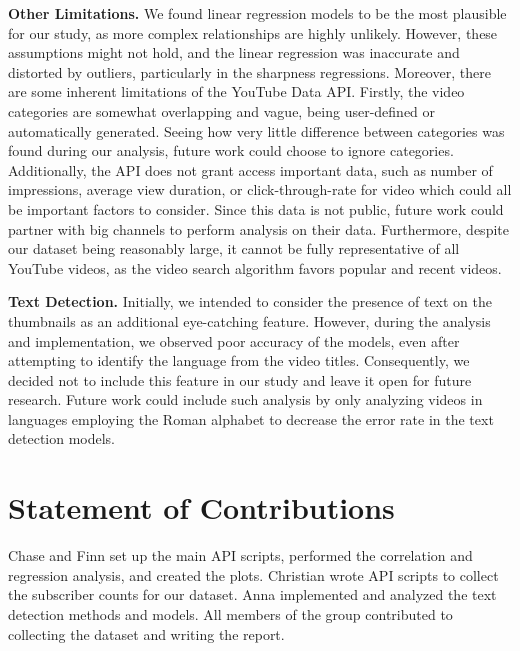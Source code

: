 \documentclass{article}
\begin{document}
\textbf{Other Limitations.} We found linear regression models to be the most plausible for our study, as more complex relationships are highly unlikely. However, these assumptions might not hold, and the linear regression was inaccurate and distorted by outliers, particularly in the sharpness regressions. Moreover, there are some inherent limitations of the YouTube Data API. Firstly, the video categories are somewhat overlapping and vague, being user-defined or automatically generated. Seeing how very little difference between categories was found during our analysis, future work could choose to ignore categories. Additionally, the API does not grant access important data, such as number of impressions, average view duration, or click-through-rate for video which could all be important factors to consider. Since this data is not public, future work could partner with big channels to perform analysis on their data. Furthermore, despite our dataset being reasonably large, it cannot be fully representative of all YouTube videos, as the video search algorithm favors popular and recent videos. 

\textbf{Text Detection.} Initially, we intended to consider the presence of text on the thumbnails as an additional eye-catching feature. However, during the analysis and implementation, we observed poor accuracy of the models, even after attempting to identify the language from the video titles. Consequently, we decided not to include this feature in our study and leave it open for future research. Future work could include such analysis by only analyzing videos in languages employing the Roman alphabet to decrease the error rate in the text detection models.

\section{Statement of Contributions}
Chase and Finn set up the main API scripts, performed the correlation and regression analysis, and created the plots. Christian wrote API scripts to collect the subscriber counts for our dataset. Anna implemented and analyzed the text detection methods and models. All members of the group contributed to collecting the dataset and writing the report.

\vfill
\pagebreak


\end{document}
